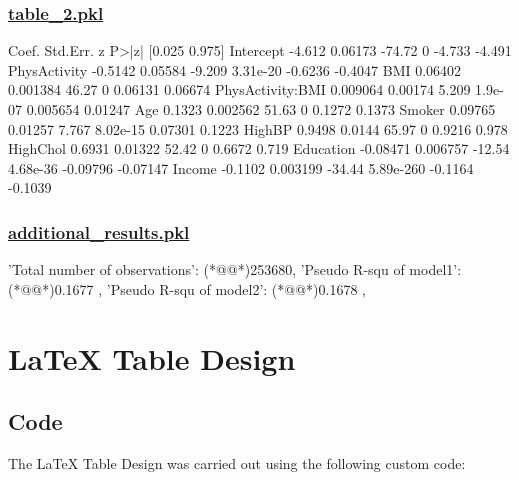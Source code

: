 \documentclass[11pt]{article}
\begin{document}
\subsubsection*{\hyperlink{code-Data Analysis-table-2-pkl}{table\_2.pkl}}

\begin{codeoutput}
                    Coef. Std.Err.      z      P>|z|   [0.025   0.975]
Intercept          -4.612  0.06173 -74.72          0   -4.733   -4.491
PhysActivity      -0.5142  0.05584 -9.209   3.31e-20  -0.6236  -0.4047
BMI               0.06402 0.001384  46.27          0  0.06131  0.06674
PhysActivity:BMI 0.009064  0.00174  5.209    1.9e-07 0.005654  0.01247
Age                0.1323 0.002562  51.63          0   0.1272   0.1373
Smoker            0.09765  0.01257  7.767   8.02e-15  0.07301   0.1223
HighBP             0.9498   0.0144  65.97          0   0.9216    0.978
HighChol           0.6931  0.01322  52.42          0   0.6672    0.719
Education        -0.08471 0.006757 -12.54   4.68e-36 -0.09796 -0.07147
Income            -0.1102 0.003199 -34.44  5.89e-260  -0.1164  -0.1039
\end{codeoutput}\hypertarget{file-additional-results-pkl}{}

\subsubsection*{\hyperlink{code-Data Analysis-additional-results-pkl}{additional\_results.pkl}}

\begin{codeoutput}
{
    'Total number of observations': (*@@*)253680,
    'Pseudo R-squ of model1': (*@@*)0.1677             ,
    'Pseudo R-squ of model2': (*@@*)0.1678            ,
}
\end{codeoutput}

\section{LaTeX Table Design}
\subsection{{Code}}
The LaTeX Table Design was carried out using the following custom code:
\end{document}
